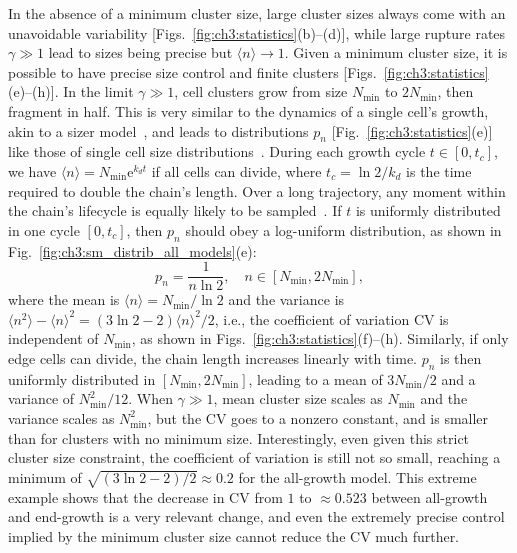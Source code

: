 In the absence of a minimum cluster size, large cluster sizes always come with an unavoidable variability [Figs.~\ref{fig:ch3:statistics}(b)--(d)], while large rupture rates $\gamma \gg 1$ lead to sizes being precise but $\langle n\rangle \to 1$. Given a minimum cluster size, it is possible to have precise size control and finite clusters [Figs.~\ref{fig:ch3:statistics}(e)--(h)]. In the limit $\gamma \gg 1$, cell clusters grow from size $N_\textrm{min}$ to $2 N_\textrm{min}$, then fragment in half. This is very similar to the dynamics of a single cell's growth, akin to a sizer model~\cite{ocal2025universal,amir2014cell}, and leads to distributions $p_n$ [Fig.~\ref{fig:ch3:statistics}(e)] like those of single cell size distributions~\cite{ocal2025universal,jia2022characterizing,amir2014cell,taheri2015cell}. During each growth cycle $t\in[0,t_c]$, we have $\langle n\rangle = N_\textrm{min}\mathrm{e}^{k_d t}$ if all cells can divide, where $t_c = \ln 2/k_d$ is the time required to double the chain's length. Over a long trajectory, any moment within the chain's lifecycle is equally likely to be sampled~\cite{ocal2025universal}. If $t$ is uniformly distributed in one cycle $[0,t_c]$, then $p_n$ should obey a log-uniform distribution, as shown in Fig.~\ref{fig:ch3:sm_distrib_all_models}(e):
\begin{equation}
    p_n = \frac{1}{n\ln 2},\quad n\in[N_\textrm{min}, 2N_\textrm{min}], \label{eq:ch3:loguniform}
\end{equation}
where the mean is $\langle n\rangle = N_\textrm{min}/\ln 2$ and the variance is $\langle n^2\rangle - \langle n\rangle^2 = (3\ln 2 - 2)\langle n\rangle^2/2$, i.e., the coefficient of variation $\mathrm{CV}$ is independent of $N_\textrm{min}$, as shown in Figs.~\ref{fig:ch3:statistics}(f)--(h). Similarly, if only edge cells can divide, the chain length increases linearly with time. $p_n$ is then uniformly distributed in $[N_\textrm{min}, 2N_\textrm{min}]$, leading to a mean of $3N_\textrm{min}/2$ and a variance of $N^2_\textrm{min}/12$. When $\gamma\gg 1$, mean cluster size scales as $N_\textrm{min}$ and the variance scales as $N^2_\textrm{min}$, but the $\mathrm{CV}$ goes to a nonzero constant, and is smaller than for clusters with no minimum size. Interestingly, even given this strict cluster size constraint, the coefficient of variation is still not so small, reaching a minimum of $\sqrt{(3 \ln 2 -2)/2} \approx 0.2$ for the all-growth model. This extreme example shows that the decrease in CV from $1$ to $\approx 0.523$ between all-growth and end-growth is a very relevant change, and even the extremely precise control implied by the minimum cluster size cannot reduce the CV much further.

